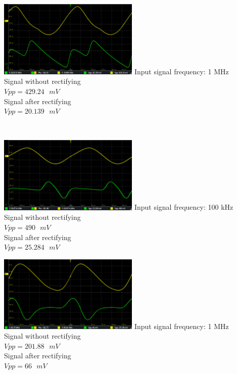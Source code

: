 \documentclass[12pt,a4paper,bold]{thesis}
\theoremstyle{thm}
\theoremstyle{definition}
\begin{document}
\hfill
\begin{minipage}[b]{0.48\linewidth}
\includegraphics[width=6.7cm]{Images/Infinion/RF20MHz.png}  
Input signal frequency: 1 MHz\\
Signal without rectifying\\
$Vpp = 429.24\text{ }mV$\\
Signal after rectifying\\
$Vpp = 20.139\text{ }mV$\\
\end{minipage}
\\
\begin{minipage}[b]{0.48\linewidth}
\includegraphics[width=6.7cm]{Images/Infinion/RF50MHz.png}  
Input signal frequency: 100 kHz\\
Signal without rectifying\\
$Vpp = 490\text{ }mV$\\
Signal after rectifying\\
$Vpp = 25.284\text{ }mV$\\
\end{minipage}
\hfill
\begin{minipage}[b]{0.48\linewidth}
\includegraphics[width=6.7cm]{Images/Infinion/RF100MHz.png}  
Input signal frequency: 1 MHz\\
Signal without rectifying\\
$Vpp = 201.88\text{ }mV$\\
Signal after rectifying\\
$Vpp = 66\text{ }mV$\\
\end{minipage}
\end{document}

